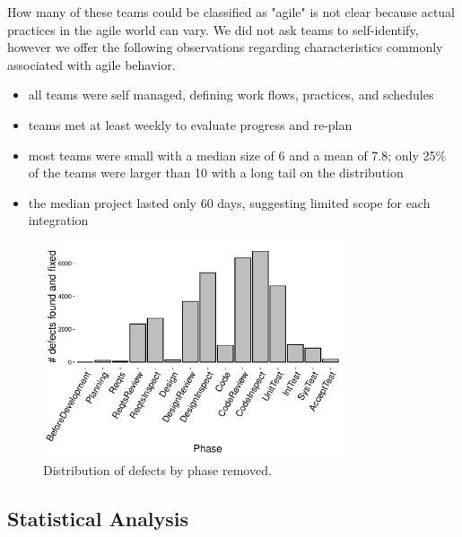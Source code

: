 \documentclass[smallcondensed]{svjour3}
\begin{document}
How many of these teams could be classified as "agile" is not clear because actual practices in the agile world can vary. We did not ask teams to self-identify, however we offer the following observations regarding characteristics commonly associated with agile behavior. 
\begin{itemize}
    \item all teams were self managed, defining work flows, practices, and schedules
    \item teams met at least weekly to evaluate progress and re-plan
    \item most teams were small with a median size of 6 and a mean of 7.8; only 25\% of the teams were larger than 10 with a long tail on the distribution
    \item the median project lasted only 60 days, suggesting limited scope for each integration
\end{itemize}
  


\begin{figure}[!t] 
\vspace{0.5cm}
\begin{center}
\includegraphics[height=2.5in]{fix-phase-dist.pdf}
\end{center} 
\caption{Distribution of defects by phase removed.}
\label{fig:fix-phase-dist}
\end{figure}





\subsection{Statistical Analysis}\label{sect:stats}
    
\end{document}
